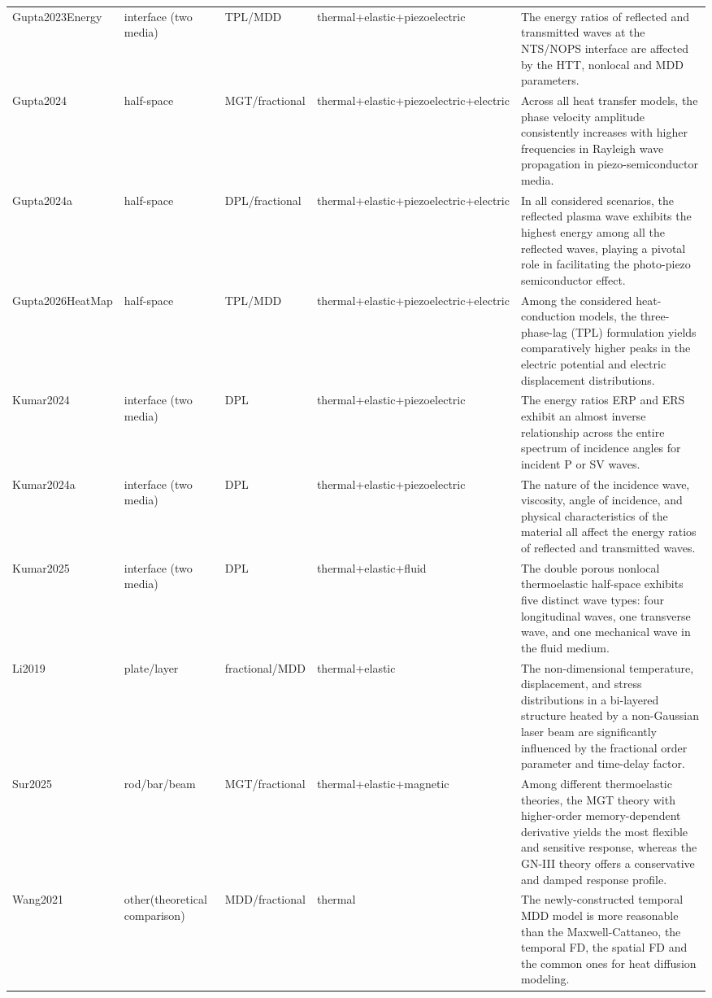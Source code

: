 \begin{longtable}{p{2.2cm}p{2.0cm}p{2.6cm}p{3.2cm}p{3.0cm}}
Gupta2023Energy & interface (two media) & TPL/MDD & thermal+elastic+piezoelectric & The energy ratios of reflected and transmitted waves at the NTS/NOPS interface are affected by the HTT, nonlocal and MDD parameters. \\
Gupta2024 & half-space & MGT/fractional & thermal+elastic+piezoelectric+electric & Across all heat transfer models, the phase velocity amplitude consistently increases with higher frequencies in Rayleigh wave propagation in piezo-semiconductor media. \\
Gupta2024a & half-space & DPL/fractional & thermal+elastic+piezoelectric+electric & In all considered scenarios, the reflected plasma wave exhibits the highest energy among all the reflected waves, playing a pivotal role in facilitating the photo-piezo semiconductor effect. \\
Gupta2026HeatMap & half-space & TPL/MDD & thermal+elastic+piezoelectric+electric & Among the considered heat-conduction models, the three-phase-lag (TPL) formulation yields comparatively higher peaks in the electric potential and electric displacement distributions. \\
Kumar2024 & interface (two media) & DPL & thermal+elastic+piezoelectric & The energy ratios ERP and ERS exhibit an almost inverse relationship across the entire spectrum of incidence angles for incident P or SV waves. \\
Kumar2024a & interface (two media) & DPL & thermal+elastic+piezoelectric & The nature of the incidence wave, viscosity, angle of incidence, and physical characteristics of the material all affect the energy ratios of reflected and transmitted waves. \\
Kumar2025 & interface (two media) & DPL & thermal+elastic+fluid & The double porous nonlocal thermoelastic half-space exhibits five distinct wave types: four longitudinal waves, one transverse wave, and one mechanical wave in the fluid medium. \\
Li2019 & plate/layer & fractional/MDD & thermal+elastic & The non-dimensional temperature, displacement, and stress distributions in a bi-layered structure heated by a non-Gaussian laser beam are significantly influenced by the fractional order parameter and time-delay factor. \\
Sur2025 & rod/bar/beam & MGT/fractional & thermal+elastic+magnetic & Among different thermoelastic theories, the MGT theory with higher-order memory-dependent derivative yields the most flexible and sensitive response, whereas the GN-III theory offers a conservative and damped response profile. \\
Wang2021 & other(theoretical comparison) & MDD/fractional & thermal & The newly-constructed temporal MDD model is more reasonable than the Maxwell-Cattaneo, the temporal FD, the spatial FD and the common ones for heat diffusion modeling. \\
\end{longtable}
